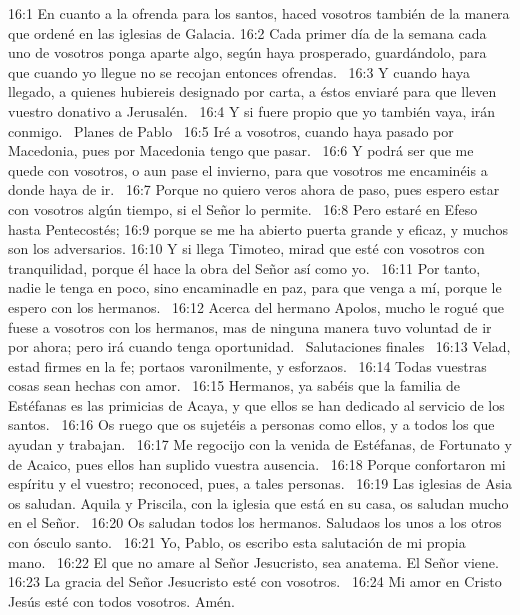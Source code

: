 16:1 En cuanto a la ofrenda para los santos, haced vosotros también de la manera que ordené en las iglesias de Galacia. 
16:2 Cada primer día de la semana cada uno de vosotros ponga aparte algo, según haya prosperado, guardándolo, para que cuando yo llegue no se recojan entonces ofrendas.  
16:3 Y cuando haya llegado, a quienes hubiereis designado por carta, a éstos enviaré para que lleven vuestro donativo a Jerusalén.  
16:4 Y si fuere propio que yo también vaya, irán conmigo.  
Planes de Pablo  
16:5 Iré a vosotros, cuando haya pasado por Macedonia, pues por Macedonia tengo que pasar.  
16:6 Y podrá ser que me quede con vosotros, o aun pase el invierno, para que vosotros me encaminéis a donde haya de ir.  
16:7 Porque no quiero veros ahora de paso, pues espero estar con vosotros algún tiempo, si el Señor lo permite.  
16:8 Pero estaré en Efeso hasta Pentecostés; 
16:9 porque se me ha abierto puerta grande y eficaz, y muchos son los adversarios. 
16:10 Y si llega Timoteo, mirad que esté con vosotros con tranquilidad, porque él hace la obra del Señor así como yo.  
16:11 Por tanto, nadie le tenga en poco, sino encaminadle en paz, para que venga a mí, porque le espero con los hermanos.  
16:12 Acerca del hermano Apolos, mucho le rogué que fuese a vosotros con los hermanos, mas de ninguna manera tuvo voluntad de ir por ahora; pero irá cuando tenga oportunidad.  
Salutaciones finales  
16:13 Velad, estad firmes en la fe; portaos varonilmente, y esforzaos.  
16:14 Todas vuestras cosas sean hechas con amor.  
16:15 Hermanos, ya sabéis que la familia de Estéfanas es las primicias de Acaya, y que ellos se han dedicado al servicio de los santos.  
16:16 Os ruego que os sujetéis a personas como ellos, y a todos los que ayudan y trabajan.  
16:17 Me regocijo con la venida de Estéfanas, de Fortunato y de Acaico, pues ellos han suplido vuestra ausencia.  
16:18 Porque confortaron mi espíritu y el vuestro; reconoced, pues, a tales personas.  
16:19 Las iglesias de Asia os saludan. Aquila y Priscila, con la iglesia que está en su casa, os saludan mucho en el Señor.  
16:20 Os saludan todos los hermanos. Saludaos los unos a los otros con ósculo santo.  
16:21 Yo, Pablo, os escribo esta salutación de mi propia mano.  
16:22 El que no amare al Señor Jesucristo, sea anatema. El Señor viene.  
16:23 La gracia del Señor Jesucristo esté con vosotros.  
16:24 Mi amor en Cristo Jesús esté con todos vosotros. Amén.  
